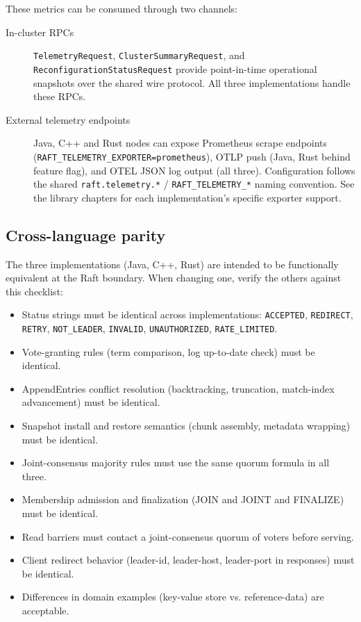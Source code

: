 These metrics can be consumed through two channels:

\begin{description}
\item[In-cluster RPCs] \texttt{TelemetryRequest}, \texttt{ClusterSummaryRequest},
  and \texttt{ReconfigurationStatusRequest} provide point-in-time operational
  snapshots over the shared wire protocol. All three implementations handle
  these RPCs.

\item[External telemetry endpoints] Java, C++ and Rust nodes can expose
  Prometheus scrape endpoints (\texttt{RAFT\_TELEMETRY\_EXPORTER=prometheus}),
  OTLP push (Java, Rust behind feature flag), and OTEL JSON log output (all
  three). Configuration follows the shared \texttt{raft.telemetry.*} /
  \texttt{RAFT\_TELEMETRY\_*} naming convention. See the library chapters for
  each implementation's specific exporter support.
\end{description}

\subsection{Cross-language parity}

The three implementations (Java, C++, Rust) are intended to be functionally
equivalent at the Raft boundary. When changing one, verify the others against
this checklist:

\begin{itemize}
\item Status strings must be identical across implementations: \texttt{ACCEPTED},
\texttt{REDIRECT}, \texttt{RETRY}, \texttt{NOT\_LEADER}, \texttt{INVALID},
\texttt{UNAUTHORIZED}, \texttt{RATE\_LIMITED}.
\item Vote-granting rules (term comparison, log up-to-date check) must be
identical.
\item AppendEntries conflict resolution (backtracking, truncation, match-index
advancement) must be identical.
\item Snapshot install and restore semantics (chunk assembly, metadata wrapping)
must be identical.
\item Joint-consensus majority rules must use the same quorum formula in all
three.
\item Membership admission and finalization (JOIN and JOINT and FINALIZE) must be
identical.
\item Read barriers must contact a joint-consensus quorum of voters before
serving.
\item Client redirect behavior (leader-id, leader-host, leader-port in
responses) must be identical.
\item Differences in domain examples (key-value store vs. reference-data) are
acceptable.
\end{itemize}

